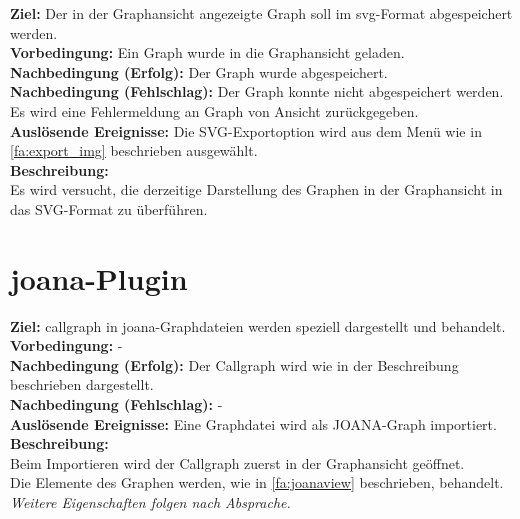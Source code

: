 \label{fa:export_svg}
\textbf{Ziel:} Der in der Graphansicht angezeigte Graph soll im \gls{svg}-Format abgespeichert werden.\\
\textbf{Vorbedingung:} Ein Graph wurde in die Graphansicht geladen.\\
\textbf{Nachbedingung (Erfolg):} Der Graph wurde abgespeichert.\\
\textbf{Nachbedingung (Fehlschlag):} Der Graph konnte nicht abgespeichert werden. Es wird eine Fehlermeldung an Graph von Ansicht zurückgegeben.\\
\textbf{Auslösende Ereignisse:} Die SVG-Exportoption wird aus dem Menü wie in \ref{fa:export_img} beschrieben ausgewählt.\\
\textbf{Beschreibung:}\\
Es wird versucht, die derzeitige Darstellung des Graphen in der Graphansicht in das SVG-Format zu überführen.

\section{\gls{joana}-Plugin}
\setcounter{fanr}{500}

\label{fa:callview}
\textbf{Ziel:} \gls{callgraph} in \gls{joana}-Graphdateien werden speziell dargestellt und behandelt.\\
\textbf{Vorbedingung:} -\\
\textbf{Nachbedingung (Erfolg):} Der Callgraph wird wie in der Beschreibung beschrieben dargestellt.\\
\textbf{Nachbedingung (Fehlschlag):} -\\
\textbf{Auslösende Ereignisse:} Eine Graphdatei wird als JOANA-Graph importiert.\\
\textbf{Beschreibung:}\\
Beim Importieren wird der Callgraph zuerst in der Graphansicht geöffnet.\\
Die Elemente des Graphen werden, wie in \ref{fa:joanaview} beschrieben, behandelt.
\textit{Weitere Eigenschaften folgen nach Absprache.}


